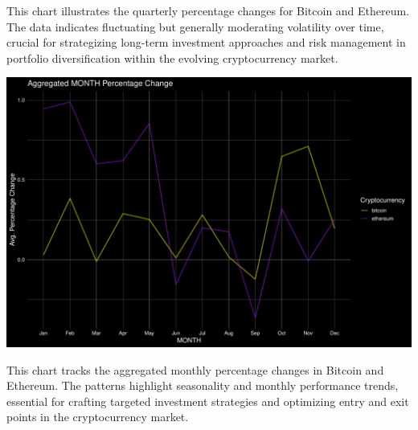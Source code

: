 \documentclass[
]{article}
\begin{document}
This chart illustrates the quarterly percentage changes for Bitcoin and
Ethereum. The data indicates fluctuating but generally moderating
volatility over time, crucial for strategizing long-term investment
approaches and risk management in portfolio diversification within the
evolving cryptocurrency market.

\includegraphics{Crypto_ETL_files/figure-latex/agg plot mom dod qoq code 1-1.pdf}

This chart tracks the aggregated monthly percentage changes in Bitcoin
and Ethereum. The patterns highlight seasonality and monthly performance
trends, essential for crafting targeted investment strategies and
optimizing entry and exit points in the cryptocurrency market.
\end{document}
